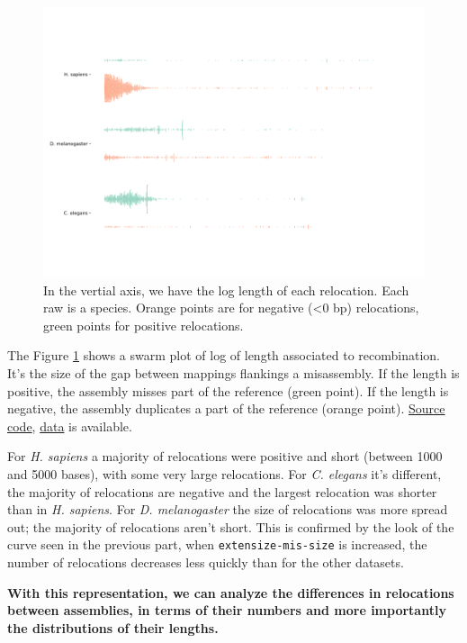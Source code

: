\documentclass[./main.tex]{subfiles}
\begin{document}
\begin{figure}
    \centering
    \includegraphics[width=\textwidth]{paper/misassemblies-in-noisy-assemblies/relocation_length.pdf}   
    \caption{In the vertial axis, we have the log length of each relocation. Each raw is a species. Orange points are for negative (\textless{}0 bp) relocations, green points for positive relocations.}
    \label{swarmplot}
\end{figure}

The Figure \ref{swarmplot} shows a swarm plot of log of length associated to
recombination. It's the size of the gap between mappings flankings a
misassembly. If the length is positive, the assembly misses part of the
reference (green point). If the length is negative, the assembly
duplicates a part of the reference (orange point).
\href{relocation_length.py}{Source code},
\href{relocation_length.csv}{data} is available.

For \emph{H. sapiens} a majority of relocations were positive and short
(between 1000 and 5000 bases), with some very large relocations. For
\emph{C. elegans} it's different, the majority of relocations are
negative and the largest relocation was shorter than in \emph{H.
sapiens}. For \emph{D. melanogaster} the size of relocations was more
spread out; the majority of relocations aren't short. This is confirmed
by the look of the curve seen in the previous part, when
\texttt{extensize-mis-size} is increased, the number of relocations
decreases less quickly than for the other datasets.

\textbf{With this representation, we can analyze the differences in
relocations between assemblies, in terms of their numbers and more
importantly the distributions of their lengths.}
\end{document}
